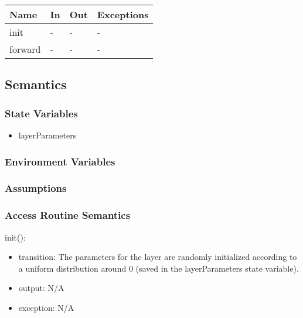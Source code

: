 \documentclass[12pt, titlepage]{article}
\begin{document}
\begin{center}
\begin{tabular}{p{2cm}|p{6cm}|p{4cm}|p{2cm}}
\hline
\textbf{Name} & \textbf{In} & \textbf{Out} & \textbf{Exceptions} \\
\hline
init & - & - & - \\
\hline
forward & - & - & - \\
\hline
\end{tabular}
\end{center}

\subsection{Semantics}

\subsubsection{State Variables}
\begin{itemize}
  \item layerParameters
\end{itemize}

\subsubsection{Environment Variables}



\subsubsection{Assumptions}



\subsubsection{Access Routine Semantics}
\noindent init():
\begin{itemize}
\item transition: The parameters for the layer are randomly initialized according to a uniform distribution around 0 (saved in the layerParameters state variable). 
\item output: N/A
\item exception: N/A
\end{itemize}
\end{document}
